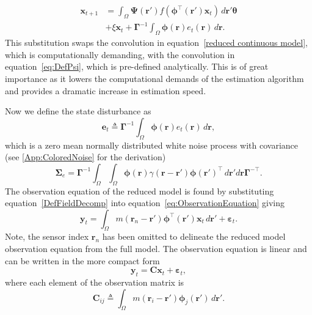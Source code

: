 \documentclass[review,authoryear,3p]{elsarticle}
\begin{document}
\begin{align}
	\mathbf{x}_{t+1} &= \int_\Omega \boldsymbol{\Psi}(\mathbf{r}') f(\boldsymbol{\phi}^{\top}(\mathbf{r}')\mathbf{x}_t) \, d\mathbf{r}' \boldsymbol{\theta} \nonumber \\ &+ \xi\mathbf{x}_t 
+ \boldsymbol{\Gamma}^{-1} \int_\Omega{\boldsymbol{\phi}(\mathbf{r})e_t(\mathbf{r}) \, d\mathbf{r}}.
\end{align}
This substitution swaps the convolution in equation~\ref{reduced continuous model}, which is computationally demanding, with the convolution in equation~\ref{eq:DefPsi}, which is pre-defined analytically. This is of great importance as it lowers the computational demands of the estimation algorithm and provides a dramatic increase in estimation speed. 

Now we define the state disturbance as
\begin{equation}\label{eq:Wt} 
	\mathbf{e}_t \triangleq \boldsymbol{\Gamma}^{-1}\int_\Omega {\boldsymbol{\phi} ( \mathbf{r} )e_t( \mathbf{r} ) \, d\mathbf{r}},
\end{equation}
which is a zero mean normally distributed white noise process with covariance (see \ref{App:ColoredNoise} for the derivation)
\begin{equation}
	\boldsymbol\Sigma_e =\mathbf{\Gamma}^{-1}\int_{\Omega}\int_{\Omega}\boldsymbol{\phi}\left(\mathbf r\right) \gamma\left(\mathbf r- \mathbf r' \right)\boldsymbol{\phi}\left(\mathbf r'\right)^{\top} \, d\mathbf r' d\mathbf r\mathbf{\Gamma}^{- \top}. 
\end{equation}
The observation equation of the reduced model is found by substituting equation~\ref{DefFieldDecomp} into equation~\ref{eq:ObservationEquation} giving
\begin{equation}\label{eq:ReducedObservationEquation}
	\mathbf{y}_t = \int_{\Omega}{m\left(\mathbf{r}_n-\mathbf{r}'\right)\boldsymbol{\phi}^{\top}\left(\mathbf{r'}\right) \mathbf{x}_t\, d\mathbf{r}'} + \boldsymbol{\varepsilon}_t. 
\end{equation}
Note, the sensor index $\mathbf{r}_n$ has been omitted to delineate the reduced model observation equation from the full model. The observation equation is linear and can be written in the more compact form
\begin{equation}\label{ObservationEquation} 
	\mathbf{y}_t = \mathbf{C}\mathbf{x}_t + \boldsymbol{\varepsilon}_t,
\end{equation}
where each element of the observation matrix is 
\begin{equation}
	\mathbf{C}_{ij} \triangleq \int_{\Omega}m(\mathbf{r}_i - \mathbf{r}')\boldsymbol{\phi}_j(\mathbf{r}') \, d\mathbf{r}'.
\end{equation}
\end{document}
